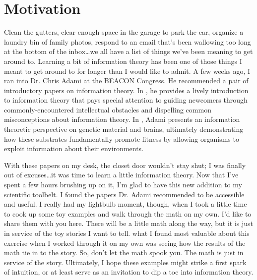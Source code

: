 \section{Motivation}
Clean the gutters, clear enough space in the garage to park the car, organize a laundry bin of family photos, respond to an email that's been wallowing too long at the bottom of the inbox\ldots we all have a list of things we've been meaning to get around to.
Learning a bit of information theory has been one of those things I meant to get around to for longer than I would like to admit.
A few weeks ago, I ran into Dr. Chris Adami at the BEACON Congress.
He recommended a pair of introductory papers on information theory.
In \cite{Adami2016}, he provides a lively introduction to information theory that pays special attention to guiding newcomers through commonly-encountered intellectual obstacles and dispelling common misconceptions about information theory.
In \cite{Adami2012}, Adami presents an information theoretic perspective on genetic material and brains, ultimately demonstrating how these substrates fundamentally promote fitness by allowing organisms to exploit information about their environments.

With these papers on my desk, the closet door wouldn't stay shut;
I was finally out of excuses\ldots it was time to learn a little information theory.
Now that I've spent a few hours brushing up on it, I'm glad to have this new addition to my scientific toolbelt.
I found the papers Dr. Adami recommended to be accessible and useful.
I really had my lightbulb moment, though, when I took a little time to cook up some toy examples and walk through the math on my own.
I'd like to share them with you here.
There will be a little math along the way, but it is just in service of the toy stories I want to tell.
what I found most valuable about this exercise when I worked through it on my own was seeing how the results of the math tie in to the story.
So, don't let the math spook you.
The math is just in service of the story.
Ultimately, I hope these examples might strike a first spark of intuition, or at least serve as an invitation to dip a toe into information theory.
